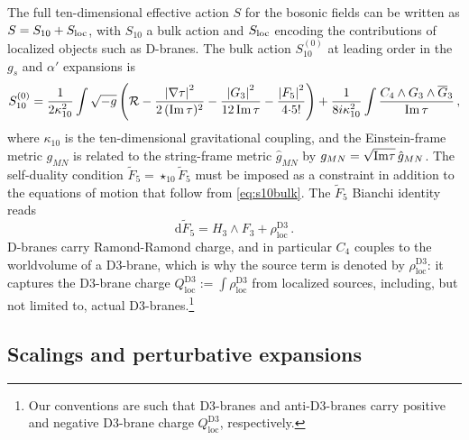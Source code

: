 \documentclass[12pt,a4wide]{article}
\begin{document}
The full ten-dimensional effective action $S$ for the bosonic fields can be written as
$S=S_{10} +S_{\rm{loc}}$, with $S_{10}$ a bulk action and $S_{\rm{loc}}$ encoding the contributions of localized objects such as D-branes.  
The bulk action $S_{10}^{(0)}$ at leading order in the $g_s$ and $\alpha'$ expansions is 
\begin{equation}\label{eq:s10bulk}
 S_{10}^{(0)} =\frac{1}{2\kappa_{10}^2}\int\sqrt{-g}\left( \mathcal{R}-\frac{\left |\nabla \tau \right |^2}{2\,(\rm{Im}\,\tau)^2} -\frac{\left |G_3\right |^2}{12\,\rm{Im}\,\tau}-\frac{\left |F_5 \right |^2}{4{\cdot} 5!}\right)+\frac{1}{8 i \kappa_{10}^2}\int \frac{C_4\wedge G_3\wedge \overline G_3}{\rm{Im}\,\tau}\,,
\end{equation}
where $\kappa_{10}$ is the ten-dimensional gravitational coupling, and the Einstein-frame metric $g_{MN}$ is related to the string-frame metric $\hat g_{MN}$ by $g_{MN}=\sqrt{\rm{Im}\tau}\,\hat g_{MN}$.
The self-duality condition $\tilde{F}_5 = \star_{10} \tilde{F}_5$ must be imposed as a constraint in addition to the equations of motion that follow from \eqref{eq:s10bulk}.
The $\tilde{F}_5$ Bianchi identity reads
\begin{equation}\label{eq:f5bi}
    \mathrm{d}\tilde{F}_5 = H_3 \wedge F_3 + \rho_{\text{loc}}^{\text{D3}}\,.
\end{equation}
D-branes carry Ramond-Ramond charge, and in particular 
$C_4$ couples to the worldvolume of a D3-brane, which is why 
the source term is denoted by $\rho_{\text{loc}}^{\text{D3}}$: it captures the D3-brane charge $Q_{\text{loc}}^{\text{D3}}:= \int \rho_{\text{loc}}^{\text{D3}}$ from localized sources, including, but not limited to, actual D3-branes.\footnote{Our conventions are such that D3-branes and anti-D3-branes carry positive and negative D3-brane charge $Q_{\text{loc}}^{\text{D3}}$, respectively.}

\subsection{Scalings and perturbative expansions}\label{sec:pert}
\end{document}
